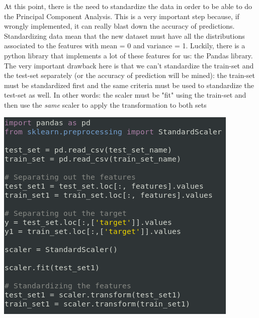 At this point, there is the need to standardize the data in order to be able to do the Principal Component Analysis. This is a very important step because, if wrongly implemented, it can really blast down the accuracy of predictions.\newline
Standardizing data mean that the new dataset must have all the distributions associated to the features with mean = 0 and variance = 1.\newline\newline
Luckily, there is a python library that implements a lot of these features for us: the Pandas library.\newline\newline
The very important drawback here is that we can't standardize the train-set and the test-set separately (or the accuracy of prediction will be mined): the train-set must be standardized first and the same criteria must be used to standardize the test-set as well. In other words: the scaler must be "fit" using the train-set and then use the \emph{same} scaler to apply the transformation to both sets\newline\newline
\vspace{0.3cm}
\begin{minipage}{\linewidth}

	\centering
	\includegraphics[width=\textwidth]{img/Normalization.png}
\end{minipage}

